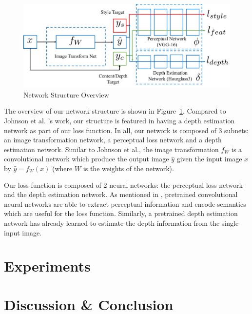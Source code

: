 \documentclass[10pt,twocolumn,letterpaper]{article}
\begin{document}
\begin{figure}[h]
\centering
\includegraphics[scale=0.4]{network_structure.pdf}
\caption{Network Structure Overview}
\label{fig:overview}
\end{figure}
The overview of our network structure is shown in Figure~\ref{fig:overview}. Compared to Johnson et al. \cite{johnson2016perceptual}'s work, our structure is featured in having a depth estimation network as part of our loss function. In all, our network is composed of 3 subnets: an image transformation network, a perceptual loss network and a depth estimation network. Similar to Johnson et al., the image transformation $f_W$ is a convolutional network which produce the output image $\hat y$ given the input image $x$ by $\hat y = f_W(x)$ (where $W$ is the weights of the network).

Our loss function is composed of 2 neural networks: the perceptual loss network and the depth estimation network. As mentioned in \cite{johnson2016perceptual}, pretrained convolutional neural networks are able to extract perceptual information and encode semantics which are useful for the loss function. Similarly, a pretrained depth estimation network has already learned to estimate the depth information from the single input image. 


\section{Experiments}

\section{Discussion \& Conclusion}



{\small


}
\end{document}
